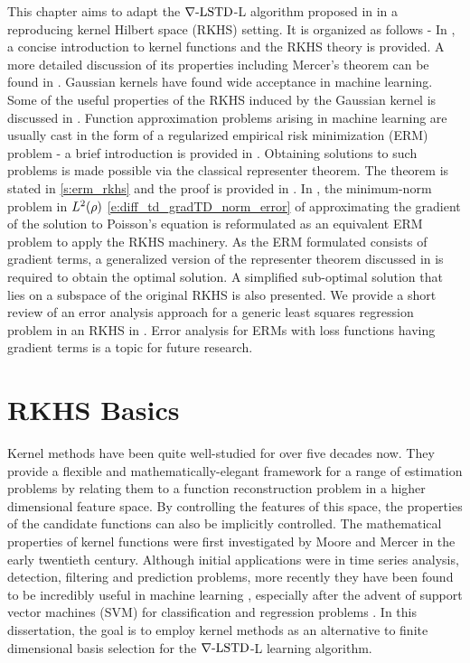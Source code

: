 This chapter aims to adapt the $\nabla\text{-LSTD}$-L algorithm proposed in  in a reproducing kernel Hilbert space (RKHS) setting. It is organized as follows - In , a concise introduction to kernel functions and the RKHS theory is provided. A more detailed discussion of its properties including Mercer's theorem can be found in . Gaussian kernels have found wide acceptance in machine learning. Some of the useful properties of the RKHS induced by the Gaussian kernel is discussed in . Function approximation problems arising in machine learning are usually cast in the form of a regularized empirical risk minimization (ERM) problem - a brief introduction is provided in . Obtaining solutions to such problems is made possible via the classical representer theorem. The theorem is stated in \ref{s:erm_rkhs} and the proof is provided in . In , the minimum-norm problem in $L^2(\rho)$ \eqref{e:diff_td_gradTD_norm_error} of approximating the gradient of the solution to Poisson's equation is reformulated as an equivalent ERM problem to apply the RKHS machinery. As the ERM formulated consists of gradient terms, a generalized  version of the representer theorem discussed in  is required to obtain the optimal solution.  A simplified sub-optimal solution that lies on a subspace of the original RKHS is also presented. We provide a short review of an error analysis approach for a generic least squares regression problem in an RKHS in . Error analysis for ERMs with loss functions having gradient terms is a topic for future research.%

\section{RKHS Basics}
\label{s:rkhs_basics}
Kernel methods have been quite well-studied for over five decades now. They provide a flexible and mathematically-elegant framework for a range of estimation problems by relating them to a function reconstruction problem in a higher dimensional feature space. By controlling the features of this space, the properties of the candidate functions can also be implicitly controlled. The mathematical properties of kernel functions were first investigated by Moore \cite{moo1916} and Mercer \cite{merrus09} in the early twentieth century. Although initial applications were in time series analysis, detection, filtering and prediction problems, more recently they have been found to be incredibly useful in machine learning \cite{wah90}, especially after the advent of support vector machines (SVM) for classification and regression problems \cite{corvap95, drucburkaufsmovap97}. In this dissertation, the goal is to employ kernel methods as an alternative to finite dimensional basis selection for the $\nabla\text{-LSTD}$-L learning algorithm. 
